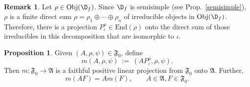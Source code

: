 \documentclass[11pt]{article}
\newcommand{\alg}[1]{\mathfrak{#1}}
\theoremstyle{definition}
\newtheorem{prop}[thm]{Proposition}
\theoremstyle{definition}
\newtheorem{note}[thm]{Remark}
\theoremstyle{remark}
\newenvironment{eqn}{\begin{equation}}{\end{equation}}
\newcommand{\Obj}{\mathrm{Obj}}
\newcommand{\End}{\mathrm{End}}
\begin{document}
\begin{note} Let $\rho \in \Obj (\D _f)$.  Since $\D _f$ is semisimple (see Prop.\
  \ref{semisimple}), $\rho$ is a finite direct sum $\rho =\rho _1\oplus \cdots \oplus
  \rho _n$ of irreducible objects in $\Obj (\D _f)$.  Therefore, there is a
  projection $P_{\iota}^{\rho}\in \End (\rho )$ onto the direct sum of those
  irreducibles in this decomposition that are isomorphic to $\iota$.  \end{note}



\begin{prop} Given $(A,\rho ,\psi )\in \alg{F}_0$, define
  \begin{equation} m(A,\rho ,\psi ) \: := \: (AP_{\iota}^{\rho},\rho ,\psi ) .
  \end{equation} Then $m:\alg{F}_0\to \alg{A}$ is a faithful positive linear
  projection from $\alg{F}_0$ onto $\alg{A}$.  Further,
  \begin{eqn} m(AF)=Am(F) ,\qquad A\in \alg{A},F\in \alg{F}_0  . \label{module}
  \end{eqn} \label{conditional} \end{prop}
\end{document}
